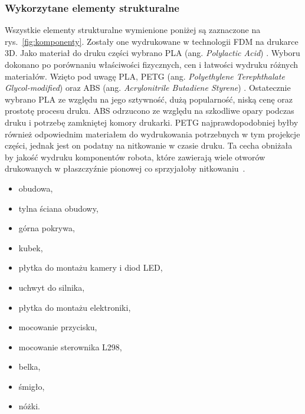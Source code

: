 \subsubsection{Wykorzytane elementy strukturalne}
Wszystkie elementy strukturalne wymienione poniżej są zaznaczone na rys.~\ref{fig:komponenty}. Zostały one wydrukowane w technologii FDM na drukarce 3D. Jako materiał do druku części wybrano
PLA (ang. \textit{Polylactic Acid}) \cite{plaprusa}. Wyboru dokonano po porównaniu właściwości fizycznych, cen i łatwości wydruku różnych materiałów. Wzięto pod uwagę
PLA, PETG (ang. \textit{Polyethylene Terephthalate Glycol-modified}) \cite{PETG} oraz ABS (ang. \textit{Acrylonitrile Butadiene Styrene}) \cite{ABS}. Ostatecznie wybrano PLA ze względu na jego sztywność, dużą popularność,
niską cenę oraz prostotę procesu druku. ABS odrzucono ze względu na szkodliwe opary podczas druku i potrzebę zamkniętej komory drukarki. PETG najprawdopodobniej
byłby również odpowiednim materiałem do wydrukowania potrzebnych w tym projekcje części, jednak jest on podatny na nitkowanie w czasie druku. Ta cecha
obniżała by jakość wydruku komponentów robota, które zawierają wiele otworów drukowanych w płaszczyźnie pionowej co sprzyjałoby nitkowaniu~\cite{PLA}\cite{PLA2}.
    \begin{itemize}
        \item obudowa,
        \item tylna ściana obudowy,
        \item górna pokrywa,
        \item kubek,
        \item płytka do montażu kamery i diod LED,
        \item uchwyt do silnika,
        \item płytka do montażu elektroniki,
        \item mocowanie przycisku,
        \item mocowanie sterownika L298,
        \item belka,
        \item śmigło,
        \item nóżki.
    \end{itemize}\
